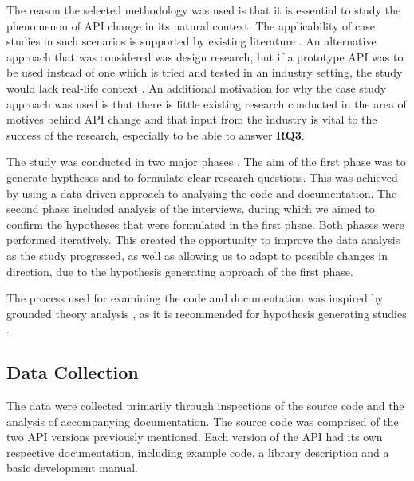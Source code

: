 \documentclass{sig-alternate}
\begin{document}
The reason the selected methodology was used is that it is essential to study the phenomenon of API change in its natural context. The applicability of case studies in such scenarios is supported by existing literature \cite{benbasat1987case, runeson2009guidelines, yin2013case, robson2002real}. An alternative approach that was considered was design research, but if a prototype API was to be used instead of one which is tried and tested in an industry setting, the study would lack real-life context \cite{runeson2009guidelines}. An additional motivation for why the case study approach was used is that there is little existing research conducted in the area of motives behind API change and that input from the industry is vital to the success of the research, especially to be able to answer \textbf{RQ3}. 

The study was conducted in two major phases \cite{andersson2007spiral}. The aim of the first phase was to generate hyptheses and to formulate clear research questions. This was achieved by using a data-driven approach to analysing the code and documentation. The second phase included analysis of the interviews, during which we aimed to confirm the hypotheses that were formulated in the first phsae. Both phases were performed iteratively. This created the opportunity to improve the data analysis as the study progressed, as well as allowing us to adapt to possible changes in direction, due to the hypothesis generating approach of the first phase. 

The process used for examining the code and documentation was inspired by grounded theory analysis \cite{seaman1999qualitative}, as it is recommended for hypothesis generating studies \cite{runeson2009guidelines, seaman1999qualitative}. 






\subsection{Data Collection} \label{data_collection}  
The data were collected primarily through inspections of the source code and the analysis of accompanying documentation. The source code was comprised of the two API versions previously mentioned. Each version of the API had its own respective documentation, including example code, a library description and a basic development manual. 
\end{document}
